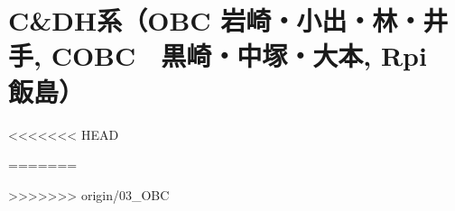 \section{C\&DH系（OBC 岩崎・小出・林・井手, COBC　黒崎・中塚・大本, Rpi　飯島）}
<<<<<<< HEAD

=======

>>>>>>> origin/03_OBC
